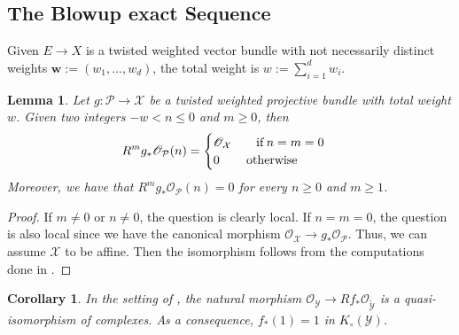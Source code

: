 \documentclass[12pt]{amsart}
\newcommand{\sO}{\mathscr{O}}
\newcommand{\cP}{\mathcal{P}}
\newcommand{\cX}{\mathcal{X}}
\newcommand{\cY}{\mathcal{Y}}
\newcommand{\Kgroup}{K_{\circ}}
\newtheorem{Lemma}[theorem]{Lemma}
\newtheorem{Cor}[theorem]{Corollary}
\theoremstyle{definition}
\begin{document}
\subsection{The Blowup exact Sequence}\label{sub:blowup-main-theorem}

Given $E\rightarrow X$ is a twisted weighted vector bundle with not necessarily distinct weights $\mathbf{w}:=(w_1,\dots,w_d)$, the total weight is $w:=\sum_{i=1}^d w_i$.

\begin{Lemma}\label{lem:cohomology-proj-bundle}
    Let $g:\cP \rightarrow \cX$ be a twisted weighted projective bundle with total weight $w$. Given two integers $-w < n \leq 0$ and $m\geq 0$, then
    $$ R^mg_*\sO_{\cP}(n) = \begin{cases}
        \sO_{\cX} \qquad {\rm if }\, n=m=0 \\
        0 \qquad \, {\rm otherwise}
    \end{cases}$$
    Moreover, we have that $R^mg_*\sO_{\cP}(n)=0$ for every $n\geq 0$ and $m\geq 1$.
\end{Lemma}
\begin{proof}
  If $m\neq 0$ or $n\neq0$, the question is clearly local. If $n=m=0$, the question is also local since we have the canonical morphism $\sO_{\cX}\rightarrow g_*\sO_{\cP}$. Thus, we can assume $\cX$ to be affine. Then the isomorphism follows from the computations done in \cite[Section 1.4]{Dol}.
\end{proof}

\begin{Cor}\label{cor:push-forward-of-1}
    In the setting of , the natural morphism $\sO_{\cY}\rightarrow Rf_*\sO_{\widetilde{\cY}}$ is a quasi-isomorphism of complexes. As a consequence, $f_*(1)=1$ in $\Kgroup(\cY)$.
\end{Cor}
\end{document}
